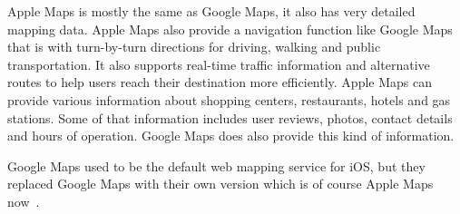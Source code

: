 Apple Maps is mostly the same as Google Maps, it also has very detailed mapping data.
Apple Maps also provide a navigation function like Google Maps that is with turn-by-turn directions for driving, walking
and public transportation.
It also supports real-time traffic information and alternative routes to help users reach their destination more
efficiently.
Apple Maps can provide various information about shopping centers, restaurants, hotels and gas stations.
Some of that information includes user reviews, photos, contact details and hours of operation.
Google Maps does also provide this kind of information.

Google Maps used to be the default web mapping service for iOS, but they replaced Google Maps with their own version
which is of course Apple Maps now~\cite{applemaps2023}.
